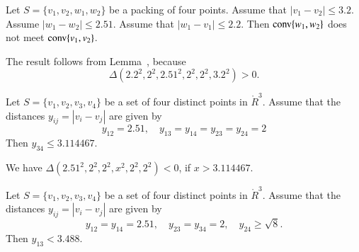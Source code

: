 \begin{tarskidata}
\begin{tarski}
\begin{lemma}
Let $S=\{v_1,v_2,w_1,w_2\}$ be a packing of four points. 
Assume that $|v_1-v_2|\le 3.2$.  Assume $|w_1-w_2|\le 2.51$. 
Assume that
	$|w_1-v_1|\le 2.2$.
Then
${\operatorname{conv}}\{w_1,w_2\}$ does not meet ${\operatorname{conv}}\{v_1,v_2\}$.
\end{lemma}


\begin{proved}
The result follows from Lemma~,
because
    $$
    \Delta(2.2^2,2^2,2.51^2,2^2,2^2,3.2^2) > 0.
    $$
\swallowed\end{proved}
\end{tarski}





\begin{tarski}

\begin{lemma}
Let $S=\{v_1,v_2,v_3,v_4\}$ be a set of four distinct points in $\ring{R}^3$.  Assume that
the distances $y_{ij}=|v_i-v_j|$ are given by
	$$
	y_{12}=2.51, \quad y_{13} = y_{14}=
	y_{23}=y_{24}=2
	$$
Then $y_{34}\le 3.114467$.
\end{lemma}


\begin{proved}
We have
    $\Delta(2.51^2,2^2,2^2,x^2,2^2,2^2)<0$, if $x> 3.114467$.
\swallowed\end{proved}
\end{tarski}





\begin{tarski}

\begin{lemma}
Let $S=\{v_1,v_2,v_3,v_4\}$ be a set of four distinct points in $\ring{R}^3$.  Assume that
the distances $y_{ij}=|v_i-v_j|$ are given by
	$$
        y_{12}=y_{14}=2.51,\quad y_{23}=y_{34}=2,\quad y_{24}\ge\sqrt8.
	$$
Then $y_{13}< 3.488$.
\end{lemma}


\end{tarski}
\end{tarskidata}
